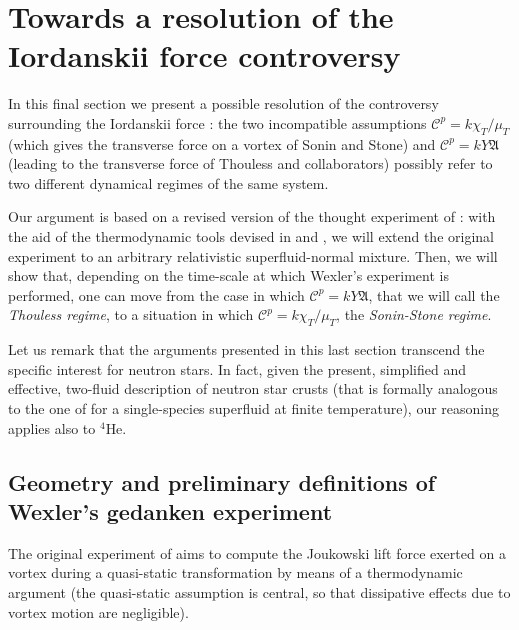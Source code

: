 \documentclass[preprints,article,accept,moreauthors,pdftex]{mdpi}
\begin{document}



\section{ Towards a resolution of the Iordanskii force controversy }
\label{sec6}

In this final section we present a possible resolution of the controversy surrounding the Iordanskii force \cite{Sonin_comment_1998}: the two incompatible assumptions $\mathcal{C}^p = k \chi_T/\mu_T$ (which gives the transverse force on a vortex of Sonin and Stone) and $ \mathcal{C}^p = k Y \mathfrak{A} $ (leading to the transverse force of Thouless and collaborators) possibly refer to two different dynamical regimes of the same system. 

Our argument is based on a revised version of the thought experiment of \citet{Wexler1997}: 
with the aid of the thermodynamic tools devised in \cite{Termo} and \cite{GavassinoTermometri},
we will  extend the original experiment to an arbitrary relativistic superfluid-normal mixture. Then, we will show that, depending on the time-scale at which Wexler's experiment is performed, one can move from the case in which  $ \mathcal{C}^p = k Y \mathfrak{A} $, that we will call the \textit{Thouless regime}, to a situation in which $ \mathcal{C}^p = k \chi_T/\mu_T $, the \textit{Sonin-Stone regime}.

Let us remark that the arguments presented in this last section transcend the specific interest for neutron stars. 
In fact, given the present, simplified and effective, two-fluid description of neutron star crusts (that is formally analogous to the one of \cite{GusakovHVBK} for a  single-species superfluid at finite temperature), our reasoning applies also to $^4$He.

\subsection{ Geometry and preliminary definitions of Wexler's gedanken experiment }
\label{lointrodescribo}

The original experiment of \citet{Wexler1997} aims to compute the Joukowski lift force exerted on a vortex during a quasi-static transformation by means of a thermodynamic argument (the quasi-static assumption is central, so that dissipative effects due to vortex motion are negligible).
\end{document}
